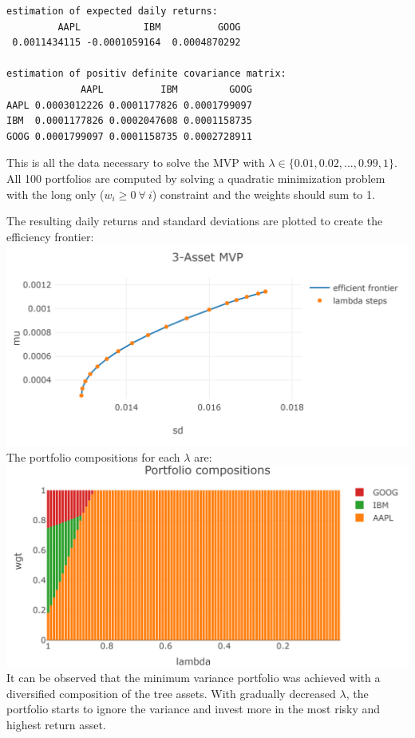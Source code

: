 \documentclass[
  oneside]{book}
\begin{document}
\begin{verbatim}
estimation of expected daily returns:
         AAPL           IBM          GOOG 
 0.0011434115 -0.0001059164  0.0004870292 

estimation of positiv definite covariance matrix:
             AAPL          IBM         GOOG
AAPL 0.0003012226 0.0001177826 0.0001799097
IBM  0.0001177826 0.0002047608 0.0001158735
GOOG 0.0001799097 0.0001158735 0.0002728911
\end{verbatim}

This is all the data necessary to solve the MVP with \(\lambda \in \{0.01, 0.02, ..., 0.99, 1\}\). All 100 portfolios are computed by solving a quadratic minimization problem with the long only (\(w_i \geq 0 \ \forall \ i\)) constraint and the weights should sum to 1.

The resulting daily returns and standard deviations are plotted to create the efficiency frontier:\\
\includegraphics{Master_Thesis_files/figure-latex/MVP_ex5-1.png}
The portfolio compositions for each \(\lambda\) are:\\
\includegraphics{Master_Thesis_files/figure-latex/MVP_ex6-1.png}
It can be observed that the minimum variance portfolio was achieved with a diversified composition of the tree assets. With gradually decreased \(\lambda\), the portfolio starts to ignore the variance and invest more in the most risky and highest return asset.
\end{document}
